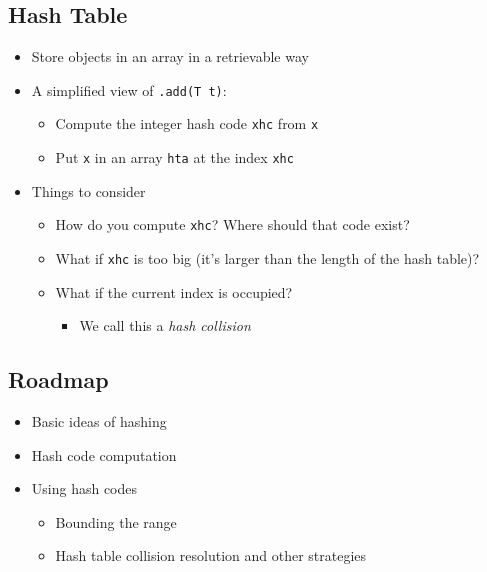 \documentclass[10pt]{article}
\begin{document}
\subsection*{Hash Table}
\begin{itemize}
    \item Store objects in an array in a retrievable way
    \item A simplified view of \texttt{.add(T t)}:
    \begin{itemize}
        \item Compute the integer hash code \texttt{xhc} from \texttt{x}
        \item Put \texttt{x} in an array \texttt{hta} at the index \texttt{xhc}
    \end{itemize}
    \item Things to consider
    \begin{itemize}
        \item How do you compute \texttt{xhc}? Where should that code exist?
        \item What if \texttt{xhc} is too big (it's larger than the length of the hash table)?
        \item What if the current index is occupied?
        \begin{itemize}
            \item We call this a \textit{hash collision}
        \end{itemize}
    \end{itemize}
\end{itemize}

\subsection*{Roadmap}
\begin{itemize}
    \item Basic ideas of hashing
    \item Hash code computation
    \item Using hash codes
    \begin{itemize}
        \item Bounding the range
        \item Hash table collision resolution and other strategies
    \end{itemize}
\end{itemize}
\end{document}
